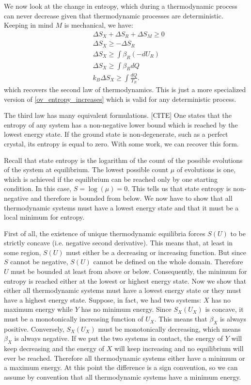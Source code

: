 \documentclass[letterpaper,twocolumn]{article}
\begin{document}
We now look at the change in entropy, which during a thermodynamic process can never decrease given that thermodynamic processes are deterministic. Keeping in mind $M$ is mechanical, we have:
\begin{equation}
\begin{aligned}
&\Delta S_X + \Delta S_R + \Delta S_M \geq 0 \\
&\Delta S_X \geq - \Delta S_R \\
&\Delta S_X \geq \int \beta_R (- dU_R) \\
&\Delta S_X \geq \int \beta_R d Q \\
&k_B \Delta S_X \geq \int \frac{d Q}{T_R}.
\end{aligned}
\end{equation}
which recovers the second law of thermodynamics. This is just a more specialized version of \eqref{ov_entropy_increases} which is valid for any deterministic process.

The third law has many equivalent formulations. [CITE] One states that the entropy of any system has a non-negative lower bound which is reached by the lowest energy state. If the ground state is non-degenerate, such as a perfect crystal, its entropy is equal to zero. With some work, we can recover this form.

Recall that state entropy is the logarithm of the count of the possible evolutions of the system at equilibrium. The lowest possible count $\mu$ of evolutions is one, which is achieved if the equilibrium can be reached only by one starting condition. In this case, $S=\log(\mu)=0$. This tells us that state entropy is non-negative and therefore is bounded from below. We now have to show that all thermodynamic systems must have a lowest energy state and that it must be a local minimum for entropy.

First of all, the existence of unique thermodynamic equilibria forces $S(U)$ to be strictly concave (i.e. negative second derivative). This means that, at least in some region, $S(U)$ must either be a decreasing or increasing function. But since $S$ cannot be negative, $S(U)$ cannot be defined on the whole domain. Therefore $U$ must be bounded at least from above or below. Consequently, the minimum for entropy is reached either at the lowest or highest energy state. Now we show that either all thermodynamic systems must have a lowest energy state or they must have a highest energy state. Suppose, in fact, we had two systems: $X$ has no maximum energy while $Y$ has no minimum energy. Since $S_X(U_X)$ is concave, it must be a monotonically increasing function of $U_X$. This means that $\beta_X$ is always positive. Conversely, $S_X(U_X)$ must be monotonically decreasing, which means $\beta_X$ is always negative. If we put the two systems in contact, the energy of $Y$ will keep decreasing and the energy of $X$ will keep increasing and no equilibrium will ever be reached. Therefore all thermodynamic systems either have a minimum or a maximum energy. At this point the difference is a sign convention, so we can assume by convention that all thermodynamic systems have a minimum energy.
\end{document}
